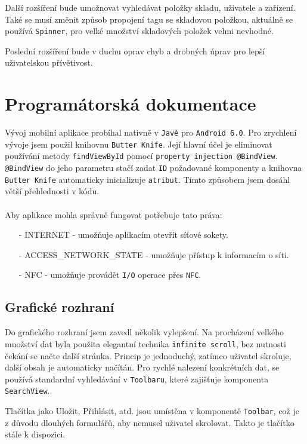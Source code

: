 \documentclass[12pt]{report}
\begin{document}
Další rozšíření bude umožnovat vyhledávat položky skladu, uživatele a zařízení.
Také se musí změnit způsob propojení tagu se skladovou položkou, aktuálně se používá \texttt{Spinner}, pro velké množství skladových položek velmi nevhodné.  

Poslední rozšíření bude v duchu oprav chyb a drobných úprav pro lepší uživatelskou přívětivost.  


\chapter{Programátorská dokumentace}
	Vývoj mobilní aplikace probíhal nativně v \texttt{Javě} pro \texttt{Android 6.0}.
	Pro zrychlení vývoje jsem použil knihovnu \texttt{Butter Knife}. Její hlavní účel je eliminovat používání metody \texttt{findViewById} pomocí \texttt{property injection @BindView}.
	\texttt{@BindView} do jeho parametru stačí zadat \texttt{ID} požadované komponenty a knihovna \texttt{Butter Knife} automaticky inicializuje \texttt{atribut}. Tímto způsobem jsem dosáhl větší přehlednosti v kódu.
\\\\
Aby aplikace mohla správně fungovat potřebuje tato práva:
\begin{itemize}[noitemsep]
\item [-] INTERNET - umožňuje aplikacím otevřít síťové sokety.
\item [-] ACCESS\_NETWORK\_STATE - umožňuje přístup k informacím o síti.
\item [-] NFC - umožňuje provádět \texttt{I/O} operace přes \texttt{NFC}.
\end{itemize}	
		
\section{Grafické rozhraní}
Do grafického rozhraní jsem zavedl několik vylepšení. Na procházení velkého množství dat byla použita elegantní technika \texttt{infinite scroll}, bez nutnosti čekání se načte další stránka. Princip je jednoduchý, zatímco uživatel skroluje, další obsah je automaticky načítán. Pro rychlé nalezení konkrétních dat, se používá standardní vyhledávání v \texttt{Toolbaru}, které zajišťuje komponenta \texttt{SearchView}.
				
Tlačítka jako Uložit, Přihlásit, atd. jsou umístěna v komponentě \texttt{Toolbar}, což je z důvodu dlouhých formulářů, aby nemusel uživatel skrolovat. Takto je tlačítko stále k dispozici.
	
\end{document}
